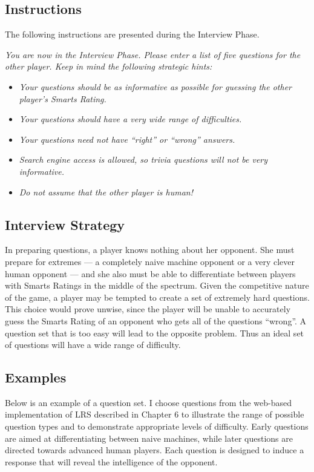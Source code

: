 \subsection{Instructions}

The following instructions are presented during the Interview Phase.
\begin{center}
\textit{You are now in the Interview Phase. Please enter a list of five questions for the other player. Keep in mind the following strategic hints:}

\begin{itemize}
\item \textit{Your questions should be as informative as possible for guessing the other player's Smarts Rating.}
\item \textit{Your questions should have a very wide range of difficulties.}
\item \textit{Your questions need not have ``right'' or ``wrong'' answers.}
\item \textit{Search engine access is allowed, so trivia questions will not be very informative.}
\item \textit{Do not assume that the other player is human!}
\end{itemize}
\end{center}

\subsection{Interview Strategy}

In preparing questions, a player knows nothing about her opponent. She must prepare for extremes --- a completely naive machine opponent or a very clever human opponent  --- and she also must be able to differentiate between players with Smarts Ratings in the middle of the spectrum. Given the competitive nature of the game, a player may be tempted to create a set of extremely hard questions. This choice would prove unwise, since the player will be unable to accurately guess the Smarts Rating of an opponent who gets all of the questions ``wrong''. A question set that is too easy will lead to the opposite problem. Thus an ideal set of questions will have a wide range of difficulty.

\subsection{Examples}

Below is an example of a question set. I choose questions from the web-based implementation of LRS described in Chapter $6$ to illustrate the range of possible question types and to demonstrate appropriate levels of difficulty. Early questions are aimed at differentiating between naive machines, while later questions are directed towards advanced human players. Each question is designed to induce a response that will reveal the intelligence of the opponent.

